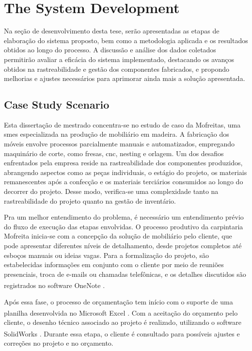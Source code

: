 \chapter{The System Development}\label{cap:development}
Na seção de desenvolvimento desta tese, serão apresentadas as etapas de elaboração do sistema proposto, bem como a metodologia aplicada e os resultados obtidos ao longo do processo. A discussão e análise dos dados coletados permitirão avaliar a eficácia do sistema implementado, destacando os avanços obtidos na rastreabilidade e gestão dos componentes fabricados, e propondo melhorias e ajustes necessários para aprimorar ainda mais a solução apresentada.

\section{Case Study Scenario}\label{section:caseStudyScenario}

Esta dissertação de mestrado concentra-se no estudo de caso da Mofreitas, uma \acrfull{smes} especializada na produção de mobiliário em madeira. A fabricação dos móveis envolve processos parcialmente manuais e automatizados, empregando maquinário de corte, como fresas, \acrfull{cnc}, nesting e orlagem. Um dos desafios enfrentados pela empresa reside na rastreabilidade dos componentes produzidos, abrangendo aspectos como as peças individuais, o estágio do projeto, os materiais remanescentes após a confecção e os materiais terciários consumidos ao longo do decorrer do projeto. Desse modo, verifica-se uma complexidade tanto na rastreabilidade do projeto quanto na gestão de inventário.

Pra um melhor entendimento do problema, é necessário um entendimento prévio do fluxo de execução das etapas envolvidas. O processo produtivo da carpintaria Mofreita inicia-se com a concepção da solução de mobiliário pelo cliente, que pode apresentar diferentes níveis de detalhamento, desde projetos completos até esboços manuais ou ideias vagas. Para a formalização do projeto, são estabelecidas informações em conjunto com o cliente por meio de reuniões presenciais, troca de e-mails ou chamadas telefônicas, e os detalhes discutidos são registrados no software OneNote\textsuperscript{\textregistered} \cite{onenote}.

Após essa fase, o processo de orçamentação tem início com o suporte de uma planilha desenvolvida no Microsoft Excel \textsuperscript{\textregistered} \cite{excel2023}. Com a aceitação do orçamento pelo cliente, o desenho técnico associado ao projeto é realizado, utilizando o software SolidWorks\textsuperscript{\textregistered} \cite{solidworks}. Durante essa etapa, o cliente é consultado para possíveis ajustes e correções no projeto e no orçamento.


